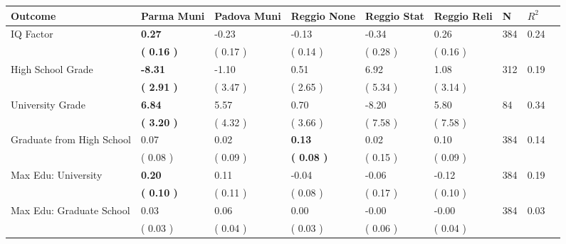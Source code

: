 \begin{tabular}{L{6.2cm} C{1.8cm} C{1.8cm} C{1.8cm} C{1.8cm} C{1.8cm} C{1.8cm} C{0.3cm} C{0.3cm}}
\toprule
 \textbf{Outcome} & \textbf{Parma Muni} & \textbf{Padova Muni} & \textbf{Reggio None} & \textbf{Reggio Stat} & \textbf{Reggio Reli} & \textbf{N} & \textbf{$ R^2$} \\
\midrule
IQ Factor & \textbf{     0.27} &     -0.23 &     -0.13 &     -0.34 &      0.26  & 384 &       0.24 \\ 
 & \textbf{(     0.16 )} & (     0.17 ) & (     0.14 ) & (     0.28 ) & (     0.16 )  & \\
High School Grade & \textbf{    -8.31} &     -1.10 &      0.51 &      6.92 &      1.08  & 312 &       0.19 \\ 
 & \textbf{(     2.91 )} & (     3.47 ) & (     2.65 ) & (     5.34 ) & (     3.14 )  & \\
University Grade & \textbf{     6.84} &      5.57 &      0.70 &     -8.20 &      5.80  & 84 &       0.34 \\ 
 & \textbf{(     3.20 )} & (     4.32 ) & (     3.66 ) & (     7.58 ) & (     7.58 )  & \\
Graduate from High School &      0.07 &      0.02 & \textbf{     0.13} &      0.02 &      0.10  & 384 &       0.14 \\ 
 & (     0.08 ) & (     0.09 ) & \textbf{(     0.08 )} & (     0.15 ) & (     0.09 )  & \\
Max Edu: University & \textbf{     0.20} &      0.11 &     -0.04 &     -0.06 &     -0.12  & 384 &       0.19 \\ 
 & \textbf{(     0.10 )} & (     0.11 ) & (     0.08 ) & (     0.17 ) & (     0.10 )  & \\
Max Edu: Graduate School &      0.03 &      0.06 &      0.00 &     -0.00 &     -0.00  & 384 &       0.03 \\ 
 & (     0.03 ) & (     0.04 ) & (     0.03 ) & (     0.06 ) & (     0.04 )  & \\
\bottomrule
\end{tabular}
